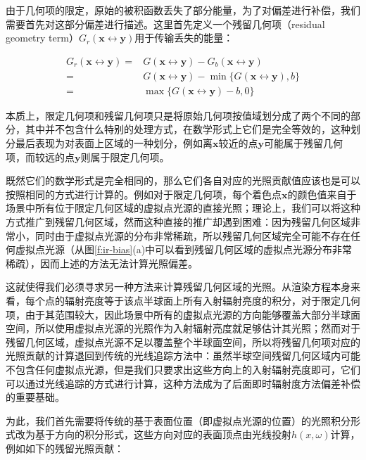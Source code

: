 由于几何项的限定，原始的被积函数丢失了部分能量，为了对偏差进行补偿，我们需要首先对这部分偏差进行描述。这里首先定义一个残留几何项（residual geometry term）$G_r(\mathbf{x}\leftrightarrow\mathbf{y})$用于传输丢失的能量：

\begin{equation}
\begin{aligned}
	G_r(\mathbf{x}\leftrightarrow\mathbf{y})=&G(\mathbf{x}\leftrightarrow\mathbf{y})-G_b(\mathbf{x}\leftrightarrow\mathbf{y})\\
	=&G(\mathbf{x}\leftrightarrow\mathbf{y})-\min\{G(\mathbf{x}\leftrightarrow\mathbf{y}),b\}\\
	=&\max\{G(\mathbf{x}\leftrightarrow\mathbf{y})-b,0\}
\end{aligned}
\end{equation}

本质上，限定几何项和残留几何项只是将原始几何项按值域划分成了两个不同的部分，其中并不包含什么特别的处理方式，在数学形式上它们是完全等效的，这种划分最后表现为对表面上区域的一种划分，例如离$\mathbf{x}$较近的点$\mathbf{y}$可能属于残留几何项，而较远的点$\mathbf{y}$则属于限定几何项。

既然它们的数学形式是完全相同的，那么它们各自对应的光照贡献值应该也是可以按照相同的方式进行计算的。例如对于限定几何项，每个着色点$\mathbf{x}$的颜色值来自于场景中所有位于限定几何区域的虚拟点光源的直接光照；理论上，我们可以将这种方式推广到残留几何区域，然而这种直接的推广却遇到困难：因为残留几何区域非常小，同时由于虚拟点光源的分布非常稀疏，所以残留几何区域完全可能不存在任何虚拟点光源（从图\ref{f:ir-bias}(a)中可以看到残留几何区域的虚拟点光源分布非常稀疏），因而上述的方法无法计算光照偏差。

这就使得我们必须寻求另一种方法来计算残留几何区域的光照。从渲染方程本身来看，每个点的辐射亮度等于该点半球面上所有入射辐射亮度的积分，对于限定几何项，由于其范围较大，因此场景中所有的虚拟点光源的方向能够覆盖大部分半球面空间，所以使用虚拟点光源的光照作为入射辐射亮度就足够估计其光照；然而对于残留几何区域，虚拟点光源不足以覆盖整个半球面空间，所以\cite{a:IlluminationinthePresenceofWeakSingularities}将残留几何项对应的光照贡献的计算退回到传统的光线追踪方法中：虽然半球空间残留几何区域内可能不包含任何虚拟点光源，但是我们只要求出这些方向上的入射辐射亮度即可，它们可以通过光线追踪的方式进行计算，这种方法成为了后面即时辐射度方法偏差补偿的重要基础。

为此，我们首先需要将传统的基于表面位置（即虚拟点光源的位置）的光照积分形式改为基于方向的积分形式，这些方向对应的表面顶点由光线投射$h(x,\omega)$计算，例如如下的残留光照贡献：

